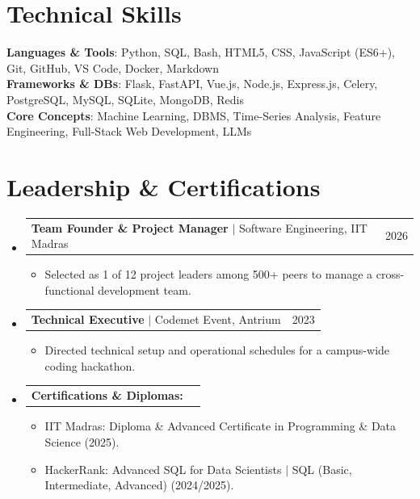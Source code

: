 \documentclass[letterpaper,11pt]{article}
\makeatletter
\newcommand{\resumeItem}[1]{
  \item\small{
    {#1 \vspace{-2pt}}
  }
}
\newcommand{\resumeProjectHeading}[2]{
    \item
    \begin{tabular*}{0.97\textwidth}{l@{\extracolsep{\fill}}r}
      \small#1 & #2 \\
    \end{tabular*}\vspace{-7pt}
}
\newcommand{\resumeSubHeadingListStart}{\begin{itemize}[leftmargin=0.15in, label={}]}
\newcommand{\resumeSubHeadingListEnd}{\end{itemize}}
\newcommand{\resumeItemListStart}{\begin{itemize}[label=--]}
\newcommand{\resumeItemListEnd}{\end{itemize}\vspace{-5pt}}
\makeatother
\begin{document}
\section{Technical Skills}
 \begin{itemize}[leftmargin=0.15in, label={}]
    \small{\item{
     \textbf{Languages \& Tools}{: Python, SQL, Bash, HTML5, CSS, JavaScript (ES6+), Git, GitHub, VS Code, Docker, Markdown} \\
     \textbf{Frameworks \& DBs}{: Flask, FastAPI, Vue.js, Node.js, Express.js, Celery, PostgreSQL, MySQL, SQLite, MongoDB, Redis} \\
     \textbf{Core Concepts}{: Machine Learning, DBMS, Time-Series Analysis, Feature Engineering, Full-Stack Web Development, LLMs}
    }}
 \end{itemize}

\section{Leadership \& Certifications}
  \resumeSubHeadingListStart
    \resumeProjectHeading
      {\textbf{Team Founder \& Project Manager} $|$ Software Engineering, IIT Madras}{2026}
      \resumeItemListStart
        \resumeItem{Selected as 1 of 12 project leaders among 500+ peers to manage a cross-functional development team.}
      \resumeItemListEnd
    \resumeProjectHeading
      {\textbf{Technical Executive} $|$ Codemet Event, Antrium}{2023}
      \resumeItemListStart
        \resumeItem{Directed technical setup and operational schedules for a campus-wide coding hackathon.}
      \resumeItemListEnd
    \resumeProjectHeading
      {\textbf{Certifications \& Diplomas:}}{}
      \resumeItemListStart
        \resumeItem{IIT Madras: Diploma \& Advanced Certificate in Programming \& Data Science (2025).}
        \resumeItem{HackerRank: Advanced SQL for Data Scientists $|$ SQL (Basic, Intermediate, Advanced) (2024/2025).}
      \resumeItemListEnd
  \resumeSubHeadingListEnd

\end{document}
